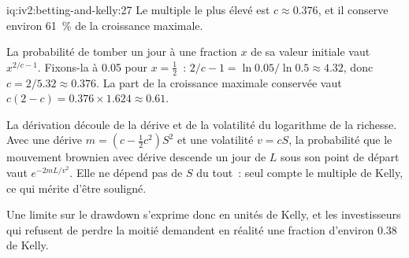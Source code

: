 \begin{solution}{iq:iv2:betting-and-kelly:27}
Le multiple le plus élevé est $c \approx 0.376$, et il conserve environ 61~\% de la croissance maximale.

La probabilité de tomber un jour à une fraction $x$ de sa valeur initiale vaut $x^{2/c - 1}$. Fixons-la à 0.05 pour $x = \tfrac12$~: $2/c - 1 = \ln 0.05/\ln 0.5 \approx 4.32$, donc $c = 2/5.32 \approx 0.376$. La part de la croissance maximale conservée vaut $c(2 - c) = 0.376 \times 1.624 \approx 0.61$.

La dérivation découle de la dérive et de la volatilité du logarithme de la richesse. Avec une dérive $m = (c - \tfrac12 c^2)S^2$ et une volatilité $v = cS$, la probabilité que le mouvement brownien avec dérive descende un jour de $L$ sous son point de départ vaut $e^{-2mL/v^2}$. Elle ne dépend pas de $S$ du tout~: seul compte le multiple de Kelly, ce qui mérite d'être souligné.

Une limite sur le drawdown s'exprime donc en unités de Kelly, et les investisseurs qui refusent de perdre la moitié demandent en réalité une fraction d'environ 0.38 de Kelly.

\end{solution}

